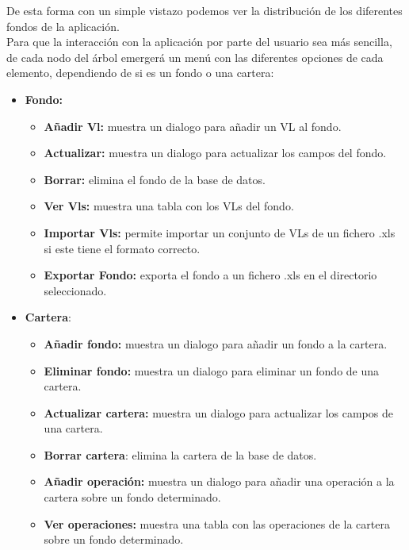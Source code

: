 \documentclass[12pt, a4paper]{book}
\begin{document}
De esta forma con un simple vistazo podemos ver la distribución de los diferentes fondos de la aplicación.
\\

Para que la interacción con la aplicación por parte del usuario sea más sencilla, de cada nodo del árbol emergerá un menú con las diferentes opciones de cada elemento, dependiendo de si es un fondo o una cartera:

\begin{itemize}
	\item \textbf{Fondo:}
	\begin{itemize}
		\item \textbf{Añadir Vl:} muestra un dialogo para añadir un \gls{VL} al fondo.
		\item \textbf{Actualizar:} muestra un dialogo para actualizar los campos del fondo.
		\item \textbf{Borrar:} elimina el fondo de la base de datos.
		\item \textbf{Ver Vls:} muestra una tabla con los \gls{VL}s del fondo.
		\item \textbf{Importar Vls:} permite importar un conjunto de \gls{VL}s de un fichero .xls si este tiene el formato correcto.
		\item \textbf{Exportar Fondo:} exporta el fondo a un fichero .xls en el directorio seleccionado.
	\end{itemize}
\end{itemize}
\newpage
\begin{itemize}
	\item \textbf{Cartera}:
	\begin{itemize}
		\item\textbf{Añadir fondo:} muestra un dialogo para añadir un fondo a la cartera.
		\item \textbf{Eliminar fondo:} muestra un dialogo para eliminar un fondo de una cartera.
		\item \textbf{Actualizar cartera:} muestra un dialogo para actualizar los campos de una cartera.
		\item \textbf{Borrar cartera}: elimina la cartera de la base de datos.
		\item \textbf{Añadir operación:} muestra un dialogo para añadir una operación a la cartera sobre un fondo determinado.
		\item \textbf{Ver operaciones:} muestra una tabla con las operaciones de la cartera sobre un fondo determinado.\\
	\end{itemize}
\end{itemize}
\end{document}
